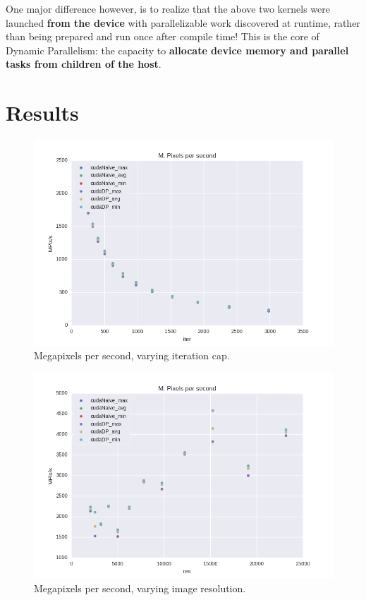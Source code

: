 \documentclass[letterpaper]{article}
\begin{document}
\begin{multicols}{2}
One major difference however, is to realize that the above two kernels were
  launched \textbf{from the device} with parallelizable work discovered at 
  runtime, rather than being prepared and run once after compile time! This is
  the core of Dynamic Parallelism: the capacity to \textbf{allocate device
  memory and parallel tasks from children of the host}.

  \section{Results}

\begin{figure}[H]
  \includegraphics[width=\linewidth]{experiments1/mpps_graph_exp_iter.png}
  \caption{Megapixels per second, varying iteration cap.}
  \label{fig:mpps_iter}
\end{figure}

\begin{figure}[H]
  \includegraphics[width=\linewidth]{experiments1/mpps_graph_exp_res.png}
  \caption{Megapixels per second, varying image resolution.}
  \label{fig:mpps_res}
\end{figure}


\end{multicols}
\end{document}
